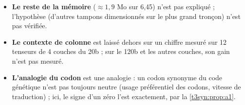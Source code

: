 \begin{faux}
\begin{itemize}
\item \textbf{Le reste de la mémoire} ($\approx 1{,}9$ Mo sur 6,45) n'est pas expliqué ; l'hypothèse (d'autres tampons dimensionnés sur le plus grand tronçon) n'est pas vérifiée.
\item \textbf{Le contexte de colonne} est laissé dehors sur un chiffre mesuré sur 12 tenseurs de 4 couches du 20b ; sur le 120b et les autres couches, son gain n'est pas mesuré.
\item \textbf{L'analogie du codon} est une analogie : un codon synonyme du code génétique n'est pas toujours neutre (usage préférentiel des codons, vitesse de traduction) ; ici, le signe d'un zéro l'est exactement, par la \cref{t3syn:prop:a1}.
\end{itemize}
\end{faux}
